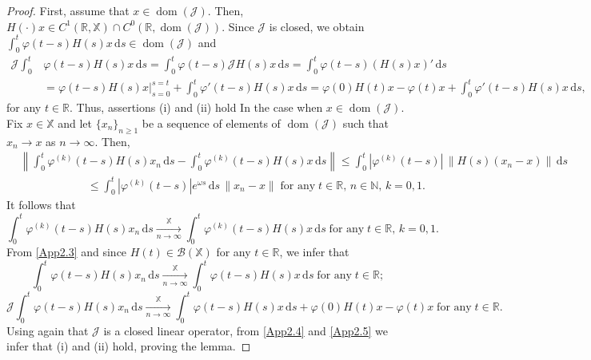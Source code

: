 \documentclass[11pt]{amsart}
\numberwithin{equation}{section}
\newcommand{\RR}{{\mathbb R}}
\newcommand{\NN}{{\mathbb N}}
\newcommand{\rmd}{{\mathrm{d}}}
\theoremstyle{remark}
\theoremstyle{definition}
\newcommand\bX{{\mathbb X}}
\begin{document}
\begin{proof}
	First, assume that $x \in \operatorname{dom}(\mathcal{J})$. Then,
	$H(\cdot) x \in C^1(\mathbb{R}, \bX) \cap C^0(\mathbb{R}, \operatorname{dom}(\mathcal{J}))$. Since $\mathcal{J}$ is closed, we obtain $\displaystyle \int_0^t \varphi(t-s) H(s) x\, \rmd s \in \operatorname{dom}(\mathcal{J})$ and
	\begin{align}\label{App2.1}
		\mathcal{J} \int_0^t &\varphi(t-s) H(s) x\, \rmd s = \int_0^t \varphi(t-s) \mathcal{J} H(s) x\, \rmd s = \int_0^t \varphi(t-s) (H(s) x)' \, \rmd s \nonumber\\
		&= \varphi(t-s) H(s) x \Big|_{s=0}^{s=t} + \int_0^t \varphi'(t-s) H(s) x\, \rmd s= \varphi(0) H(t) x - \varphi(t) x + \int_0^t \varphi'(t-s) H(s) x\, \rmd s,
	\end{align}
	for any $t \in \mathbb{R}$. Thus, assertions (i) and (ii) hold In the case when $x \in \operatorname{dom}(\mathcal{J})$. Fix $x \in \bX$ and let $\{x_n\}_{n \geq 1}$ be a sequence of elements of $\operatorname{dom}(\mathcal{J})$ such that $x_n \rightarrow x$ as $n\to\infty$. Then,
	\begin{align}\label{App2.2}
		&\left\| \int_0^t \varphi^{(k)}(t-s) H(s) x_n\, \rmd s -\int_0^t \varphi^{(k)}(t-s) H(s) x\, \rmd s \right\| \leq  \int_0^t |\varphi^{(k)}(t-s)| \, \|H(s)(x_n - x)\| \, \rmd s \nonumber\\ &\qquad\qquad\qquad\leq \int_0^t |\varphi^{(k)}(t-s)| e^{\omega s} \, \rmd s \, \|x_n - x\|\;\mbox{for any}\; t\in\RR,\,n\in\NN,\,k=0,1.
	\end{align}
	It follows that
	\begin{equation}\label{App2.3}
		\int_0^t \varphi^{(k)}(t-s) H(s) x_n\, \rmd s \xrightarrow[n \to \infty]{\quad \bX \quad} \int_0^t \varphi^{(k)}(t-s) H(s) x\, \rmd s \;\mbox{for any}\; t\in\RR,\,k=0,1.
	\end{equation}
	From \eqref{App2.3} and since $H(t) \in \mathcal{B}(\bX)$ for any $t \in \mathbb{R}$, we infer that
	\begin{equation}\label{App2.4}
		\int_0^t \varphi(t-s) H(s) x_n\, \rmd s \xrightarrow[n \to \infty]{\quad \bX \quad} \int_0^t \varphi(t-s) H(s) x\, \rmd s \;\mbox{for any}\; t\in\RR;
	\end{equation}
	\begin{equation}\label{App2.5}
		\mathcal{J} \int_0^t \varphi(t-s) H(s) x_n\, \rmd s \xrightarrow[n \to \infty]{\quad \bX \quad} \int_0^t \varphi(t-s) H(s) x\, \rmd s + \varphi(0) H(t) x - \varphi(t) x\;\mbox{for any}\; t\in\RR.
	\end{equation}
	Using again that $\mathcal{J}$ is a closed linear operator, from \eqref{App2.4} and \eqref{App2.5} we infer that (i) and (ii) hold, proving the lemma.
\end{proof}
\end{document}
